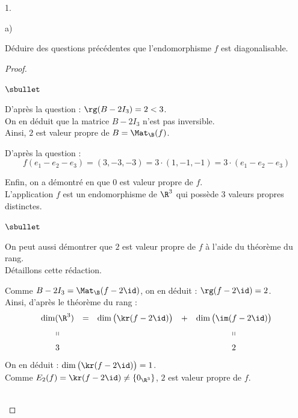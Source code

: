 \documentclass[11pt]{article}%
\begin{document}
\begin{noliste}{1.}
\begin{noliste}{a)}
  \item Déduire des questions précédentes que l'endomorphisme $f$ est
    diagonalisable.

    \begin{proof}~%
      \begin{noliste}{$\sbullet$}
      \item D'après la question  : $\rg(B - 2I_3) = 2 <
        3$.\\
        On en déduit que la matrice $B - 2 I_3$ n'est pas
        inversible.\\
        Ainsi, $2$ est valeur propre de $B = \Mat_{\B}(f)$.%

      \item D'après la question  :
        \[
        f(e_1 - e_2 - e_3) = (3, -3, -3) = 3 \cdot (1, -1, -1) = 3
        \cdot (e_1 - e_2 - e_3)
        \]


        \newpage


      \item Enfin, on a démontré en  que $0$ est valeur
        propre de $f$.\\
        L'application $f$ est un endomorphisme de $\R^3$ qui possède
        $3$ valeurs propres distinctes.%
      \end{noliste}
        \begin{remark}%
          \begin{noliste}{$\sbullet$}
          \item On peut aussi démontrer que $2$ est valeur propre de
            $f$ à l'aide du théorème du rang.\\
            Détaillons cette rédaction.
          \item Comme $B - 2I_3 = \Mat_{\B}(f - 2 \id)$, on en déduit
            : $\rg(f - 2 \id) = 2$.\\
            Ainsi, d'après le théorème du rang :
            \[
            \begin{array}{ccccc}
              \dim(\R^3) & = & \dim\big( \kr(f - 2 \id) \big) & + &
              \dim\big( \im (f - 2 \id) \big) 
              \\[.2cm]
              \shortparallel & & & & \shortparallel
              \\[.2cm]
              3 & & & & 2
            \end{array}
            \]
            On en déduit : $\dim\big( \kr(f - 2 \id) \big) = 1$.\\
            Comme $E_2(f) = \kr(f - 2 \id) \neq \{ 0_{\R^3} \}$, $2$
            est valeur propre de $f$.%
          \end{noliste}
        \end{remark}~\\[-1.4cm]
    \end{proof}
  \end{noliste}
  

\end{noliste}
\end{document}
